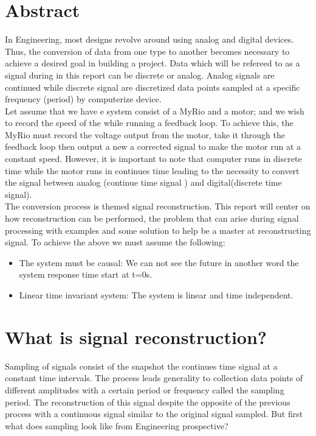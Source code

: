 \documentclass[12pt,letterpaper]{article}
\begin{document}
\begin{pycode}

\end{pycode}
\section*{Abstract}
In Engineering, most designs revolve around using analog  and digital devices. Thus, the conversion of data from one type to 
another becomes necessary to achieve a desired goal in building a project. Data which will be refereed to as a signal during
in this report can be discrete or analog. Analog signals are continued while discrete signal are discretized data points sampled
at a specific frequency (period) by computerize device. \\
Let assume that we have e system consist of a MyRio  and a motor; and we wish to record the speed of the 
while running a feedback loop. To achieve this, the MyRio must record the voltage output from the motor, take it through the 
feedback loop then output a new a corrected signal to make the motor run at a constant speed. However, it is important to note that computer runs
in discrete time while the motor runs in continues time leading to the necessity to convert the signal between analog (continue time signal ) and digital(discrete time signal).\\
The conversion process is themed signal reconstruction. This report will center on how reconstruction can be performed, the 
problem that can arise during signal processing with examples and some solution to help be a master at reconstructing signal. To 
achieve the above we must assume the following:
\begin{itemize}
    \item The system must be causal: We can not see the future in another word the system response time start at t=0s. 
    \item Linear time invariant system: The system is linear and time independent.
\end{itemize}
\section*{What is signal reconstruction?}
Sampling of signals consist of the snapshot the continues time signal at a constant
time intervals. The process leads generality to collection data points of different amplitudes
with a certain period or frequency called the sampling period. The reconstruction of this 
signal despite the opposite of the previous process with a continuous signal 
similar to the original signal sampled. But first what does sampling look like from Engineering
prospective?
\end{document}
